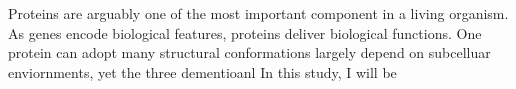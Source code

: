 Proteins are arguably one of the most important component in a living organism. As genes encode biological features, proteins deliver biological functions. One protein can adopt many structural conformations largely depend on subcelluar enviornments, yet the three dementioanl     In this study, I will be 